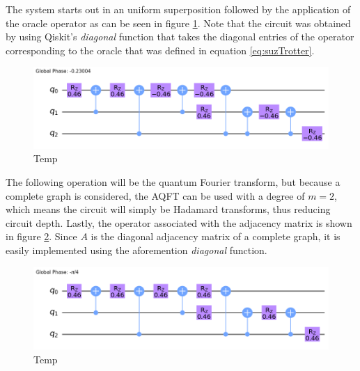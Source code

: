 \documentclass[../../dissertation.tex]{subfiles}
\begin{document}
The system starts out in an uniform superposition followed by the application
of the oracle operator as can be seen in figure
\ref{fig:contSearchOracleCircQistkit}. Note that the circuit was obtained by
using Qiskit's \textit{diagonal} function that takes the diagonal entries of
the operator corresponding to the oracle that was defined in equation
\ref{eq:suzTrotter}. 
\begin{figure}[!h]
	\centering
	\includegraphics[scale=0.30]{img/Qiskit/ContQuantumWalk/Search/Circuits/circOracle_N3_S2.png}
	\caption{Temp}
	\label{fig:contSearchOracleCircQistkit}
\end{figure}
The following operation will be the quantum Fourier transform, but because a
complete graph is considered, the AQFT can be used with a degree of $m=2$,
which means the circuit will simply be Hadamard transforms, thus reducing
circuit depth. Lastly, the operator associated with the adjacency matrix is
shown in figure \ref{fig:contSearchAdjCircQistkit}. Since $A$ is the diagonal
adjacency matrix of a complete graph, it is easily implemented using the
aforemention \textit{diagonal} function.
\begin{figure}[!h]
	\centering
	\includegraphics[scale=0.30]{img/Qiskit/ContQuantumWalk/Search/Circuits/circAjd_N3_S2.png}
	\caption{Temp}
	\label{fig:contSearchAdjCircQistkit}
\end{figure}\par
\end{document}
